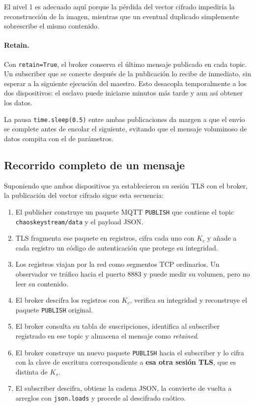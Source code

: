 \documentclass[12pt,a4paper]{article}
\newcommand{\Kc}{K_{c}}
\newcommand{\Ks}{K_{s}}
\begin{document}
El nivel 1 es adecuado aquí porque la pérdida del vector cifrado impediría la reconstrucción de la imagen, mientras que un eventual duplicado simplemente sobrescribe el mismo contenido.

\paragraph{Retain.} Con \texttt{retain=True}, el broker conserva el último mensaje publicado en cada topic. Un subscriber que se conecte después de la publicación lo recibe de inmediato, sin esperar a la siguiente ejecución del maestro. Esto desacopla temporalmente a los dos dispositivos: el esclavo puede iniciarse minutos más tarde y aun así obtener los datos.

La pausa \texttt{time.sleep(0.5)} entre ambas publicaciones da margen a que el envío se complete antes de encolar el siguiente, evitando que el mensaje voluminoso de datos compita con el de parámetros.

\subsection{Recorrido completo de un mensaje}

Suponiendo que ambos dispositivos ya establecieron su sesión TLS con el broker, la publicación del vector cifrado sigue esta secuencia:

\begin{enumerate}[leftmargin=1.4cm, itemsep=0.3em]
	\item El publisher construye un paquete MQTT \texttt{PUBLISH} que contiene el topic \texttt{chaoskeystream/data} y el payload JSON.
	\item TLS fragmenta ese paquete en registros, cifra cada uno con $\Kc$ y añade a cada registro un código de autenticación que protege su integridad.
	\item Los registros viajan por la red como segmentos TCP ordinarios. Un observador ve tráfico hacia el puerto 8883 y puede medir su volumen, pero no leer su contenido.
	\item El broker descifra los registros con $\Kc$, verifica su integridad y reconstruye el paquete \texttt{PUBLISH} original.
	\item El broker consulta su tabla de suscripciones, identifica al subscriber registrado en ese topic y almacena el mensaje como \textit{retained}.
	\item El broker construye un nuevo paquete \texttt{PUBLISH} hacia el subscriber y lo cifra con la clave de escritura correspondiente a \textbf{esa otra sesión TLS}, que es distinta de $\Ks$.
	\item El subscriber descifra, obtiene la cadena JSON, la convierte de vuelta a arreglos con \texttt{json.loads} y procede al descifrado caótico.
\end{enumerate}
\end{document}
